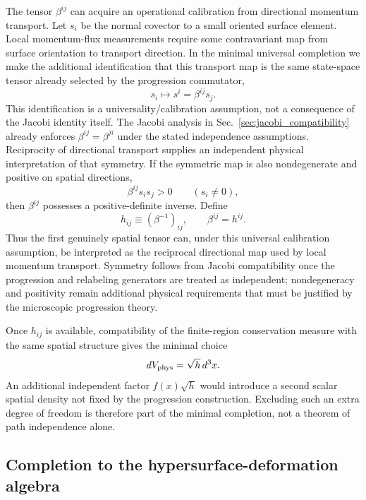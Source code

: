 \documentclass[11pt]{article}
\begin{document}
The tensor $\beta^{ij}$ can acquire an operational calibration from directional momentum transport. Let $s_i$ be the normal covector to a small oriented surface element. Local momentum-flux measurements require some contravariant map from surface orientation to transport direction. In the minimal universal completion we make the additional identification that this transport map is the same state-space tensor already selected by the progression commutator,
\begin{equation}
    s_i\longmapsto s^i=\beta^{ij}s_j.
    \label{eq:direction_map}
\end{equation}
This identification is a universality/calibration assumption, not a consequence of the Jacobi identity itself.
The Jacobi analysis in Sec.~\ref{sec:jacobi_compatibility} already enforces $\beta^{ij}=\beta^{ji}$ under the stated independence assumptions. Reciprocity of directional transport supplies an independent physical interpretation of that symmetry. If the symmetric map is also nondegenerate and positive on spatial directions,
\begin{equation}
    \beta^{ij}s_i s_j>0
    \qquad(s_i\neq0),
\end{equation}
then $\beta^{ij}$ possesses a positive-definite inverse. Define
\begin{equation}
    \boxed{h_{ij}\equiv(\beta^{-1})_{ij},\qquad \beta^{ij}=h^{ij}.}
    \label{eq:beta_metric}
\end{equation}
Thus the first genuinely spatial tensor can, under this universal calibration assumption, be interpreted as the reciprocal directional map used by local momentum transport. Symmetry follows from Jacobi compatibility once the progression and relabeling generators are treated as independent; nondegeneracy and positivity remain additional physical requirements that must be justified by the microscopic progression theory.

Once $h_{ij}$ is available, compatibility of the finite-region conservation measure with the same spatial structure gives the minimal choice
\begin{equation}
    dV_{\rm phys}=\sqrt h\,d^3x.
\end{equation}
An additional independent factor $f(x)\sqrt h$ would introduce a second scalar spatial density not fixed by the progression construction. Excluding such an extra degree of freedom is therefore part of the minimal completion, not a theorem of path independence alone.

\subsection{Completion to the hypersurface-deformation algebra}
\end{document}
